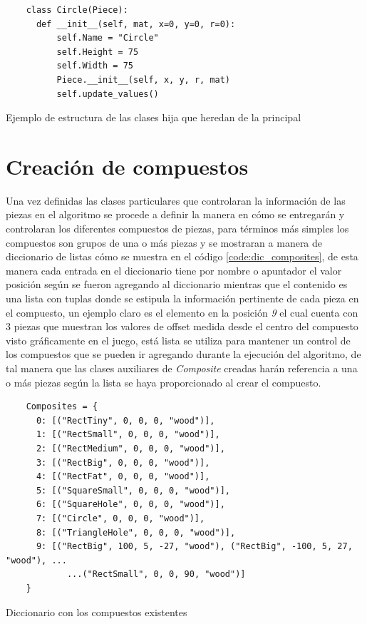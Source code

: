 \begin{listing}[ht]
  \begin{verbatim}
    class Circle(Piece):
      def __init__(self, mat, x=0, y=0, r=0):
          self.Name = "Circle"
          self.Height = 75
          self.Width = 75
          Piece.__init__(self, x, y, r, mat)
          self.update_values()
  \end{verbatim}
  \caption{Ejemplo de estructura de las clases hija que heredan de la principal}
  \label{code:dic_individual_piece}
\end{listing}

\section{Creación de compuestos}
\label{section:composite_creation}

Una vez definidas las clases particulares que controlaran la información de las
piezas en el algoritmo se procede a definir la manera en cómo se entregarán y
controlaran los diferentes compuestos de piezas, para términos más simples los
compuestos son grupos de una o más piezas y se mostraran a manera de diccionario
de listas cómo se muestra en el código \ref{code:dic_composites}, de esta manera
cada entrada en el diccionario tiene por nombre o apuntador el valor posición
según se fueron agregando al diccionario mientras que el contenido es una lista
con tuplas donde se estipula la información pertinente de cada pieza en el
compuesto, un ejemplo claro es el elemento en la posición \textit{9} el cual
cuenta con 3 piezas que muestran los valores de offset medida desde el centro
del compuesto visto gráficamente en el juego, está lista se utiliza para
mantener un control de los compuestos que se pueden ir agregando durante la
ejecución del algoritmo, de tal manera que las clases auxiliares de
\textit{Composite} creadas harán referencia a una o más piezas según la lista se
haya proporcionado al crear el compuesto.

\begin{listing}[ht]
  \begin{verbatim}
    Composites = {
      0: [("RectTiny", 0, 0, 0, "wood")],
      1: [("RectSmall", 0, 0, 0, "wood")],
      2: [("RectMedium", 0, 0, 0, "wood")],
      3: [("RectBig", 0, 0, 0, "wood")],
      4: [("RectFat", 0, 0, 0, "wood")],
      5: [("SquareSmall", 0, 0, 0, "wood")],
      6: [("SquareHole", 0, 0, 0, "wood")],
      7: [("Circle", 0, 0, 0, "wood")],
      8: [("TriangleHole", 0, 0, 0, "wood")],
      9: [("RectBig", 100, 5, -27, "wood"), ("RectBig", -100, 5, 27, "wood"), ...
            ...("RectSmall", 0, 0, 90, "wood")]
    } 
  \end{verbatim}
  \caption{Diccionario con los compuestos existentes}
  \label{code:dic_composites}
\end{listing}

